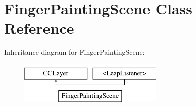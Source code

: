 \hypertarget{interface_finger_painting_scene}{\section{Finger\-Painting\-Scene Class Reference}
\label{dd/df0/interface_finger_painting_scene}
}
Inheritance diagram for Finger\-Painting\-Scene\-:\begin{figure}[H]
\begin{center}
\leavevmode
\includegraphics[height=2.000000cm]{dd/df0/interface_finger_painting_scene}
\end{center}
\end{figure}
